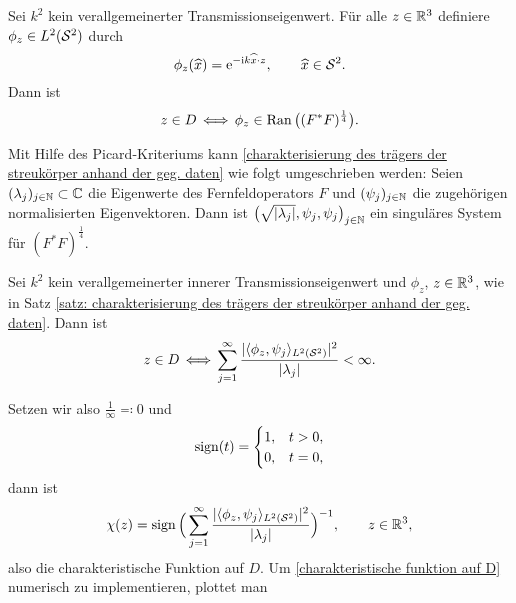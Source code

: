 \begin{satz}\label{satz: charakterisierung des trägers der streukörper anhand der geg. daten}
	Sei \(k^2\) kein verallgemeinerter Transmissionseigenwert. Für alle \(z\in\mathbb{R}^3\) definiere \(\phi_z\in L^2(\mathcal{S}^2)\) durch
	\begin{equation*}
		\phi_z(\widehat{x})=\mathrm{e}^{-\mathrm{i} k\widehat{x}\cdot z},\qquad\widehat{x}\in\mathcal{S}^2.
	\end{equation*}
	Dann ist 
	\begin{equation}
		\label{charakterisierung des trägers der streukörper anhand der geg. daten}
		z\in D\,\Longleftrightarrow\,\phi_z\in\operatorname{Ran}\big((F^\ast F)^\frac{1}{4}\big).
	\end{equation}
\end{satz}
Mit Hilfe des Picard-Kriteriums kann \eqref{charakterisierung des trägers der streukörper anhand der geg. daten} wie folgt umgeschrieben werden: Seien \((\lambda_j)_{j\in\mathbb{N}}\subset\mathbb{C}\) die Eigenwerte des Fernfeldoperators \(F\) und \((\psi_j)_{j\in\mathbb{N}}\) die zugehörigen normalisierten Eigenvektoren. Dann ist \(\big(\sqrt{|\lambda_j|},\psi_j,\psi_j\big)_{j\in\mathbb{N}}\) ein singuläres System für \((F^\ast F)^\frac{1}{4}\).
\begin{satz}\label{satz: charakterisierung des trägers mittels picard kriterium}
	Sei \(k^2\) kein verallgemeinerter innerer Transmissionseigenwert und \(\phi_z\), \(z\in\mathbb{R}^3\), wie in Satz \ref{satz: charakterisierung des trägers der streukörper anhand der geg. daten}. Dann ist
	\begin{equation}
		\label{charakterisierung des trägers mittels picard kriterium}
		z\in D\,\Longleftrightarrow\,\sum_{j=1}^\infty\frac{|\langle \phi_z, \psi_j\rangle_{L^2(\mathcal{S}^2)}|^2}{|\lambda_j|}<\infty.
	\end{equation}
\end{satz}
Setzen wir also \(\frac{1}{\infty}\eqqcolon0\) und 
\begin{equation*}
	\operatorname{sign}(t)=
	\begin{cases}
		1,&t>0,\\
		0,&t=0,
	\end{cases}
\end{equation*}
dann ist
\begin{equation}
	\label{charakteristische funktion auf D}
	\chi(z)=\operatorname{sign}\Big(\sum_{j=1}^\infty\frac{|\langle \phi_z, \psi_j\rangle_{L^2(\mathcal{S}^2)}|^2}{|\lambda_j|}\Big)^{-1},\qquad z\in\mathbb{R}^3,
\end{equation}
also die charakteristische Funktion auf \(D\). Um \eqref{charakteristische funktion auf D} numerisch zu implementieren, plottet man
